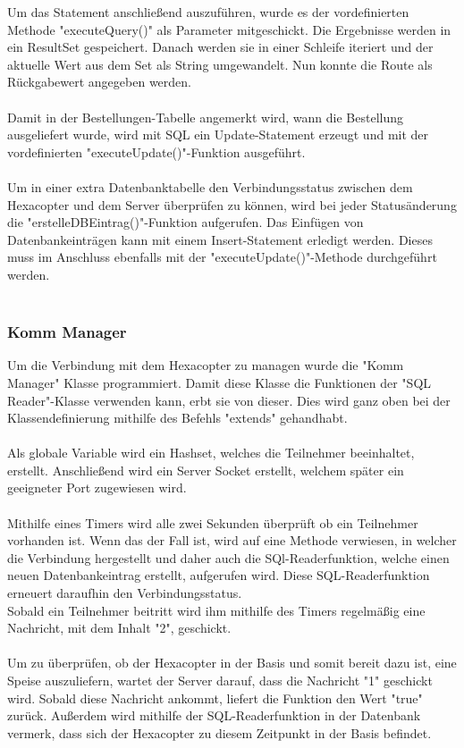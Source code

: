 Um das Statement anschließend auszuführen, wurde es der vordefinierten Methode "executeQuery()" als Parameter mitgeschickt.
Die Ergebnisse werden in ein ResultSet gespeichert. Danach werden sie in einer Schleife iteriert und der aktuelle Wert aus dem Set als String umgewandelt. Nun konnte die Route als Rückgabewert angegeben werden.
\\ \\
Damit in der Bestellungen-Tabelle angemerkt wird, wann die Bestellung ausgeliefert wurde, wird mit SQL ein Update-Statement erzeugt und mit der vordefinierten "executeUpdate()"-Funktion ausgeführt.
\\ \\
Um in einer extra Datenbanktabelle den Verbindungsstatus zwischen dem Hexacopter und dem Server überprüfen zu können, wird bei jeder Statusänderung die "erstelleDBEintrag()"-Funktion aufgerufen. Das Einfügen von Datenbankeinträgen kann mit einem Insert-Statement erledigt werden. Dieses muss im Anschluss ebenfalls mit der "executeUpdate()"-Methode durchgeführt werden.
\\ \\
\subsubsection*{Komm Manager}
Um die Verbindung mit dem Hexacopter zu managen wurde die "Komm Manager" Klasse programmiert.
Damit diese Klasse die Funktionen der "SQL Reader"-Klasse verwenden kann, erbt sie von dieser. Dies wird ganz oben bei der Klassendefinierung mithilfe des Befehls "extends" gehandhabt.
\\ \\
Als globale Variable wird ein Hashset, welches die Teilnehmer beeinhaltet, erstellt.
Anschließend wird ein Server Socket erstellt, welchem später ein geeigneter Port zugewiesen wird.
\\ \\
Mithilfe eines Timers wird alle zwei Sekunden überprüft ob ein Teilnehmer vorhanden ist. Wenn das der Fall ist, wird auf eine Methode verwiesen, in welcher die Verbindung hergestellt und daher auch die SQl-Readerfunktion, welche einen neuen Datenbankeintrag erstellt, aufgerufen wird. Diese SQL-Readerfunktion erneuert daraufhin den Verbindungsstatus.
\\
Sobald ein Teilnehmer beitritt wird ihm mithilfe des Timers regelmäßig eine Nachricht, mit dem Inhalt "2", geschickt.
\\ \\
Um zu überprüfen, ob der Hexacopter in der Basis und somit bereit dazu ist, eine Speise auszuliefern, wartet der Server darauf, dass die Nachricht "1" geschickt wird. Sobald diese Nachricht ankommt, liefert die Funktion den Wert "true" zurück. Außerdem wird mithilfe der SQL-Readerfunktion in der Datenbank vermerk, dass sich der Hexacopter zu diesem Zeitpunkt in der Basis befindet.
\\ \\
